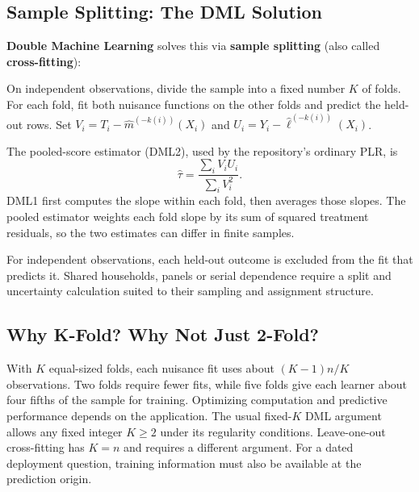 \subsection{Sample Splitting: The DML
Solution}\label{_sample_splitting_the_dml_solution}

\textbf{Double Machine Learning} solves this via \textbf{sample
splitting} (also called \textbf{cross-fitting}):

\begin{definition}
\label{def:cross_fitting}
%
On independent observations, divide the sample into a fixed number \(K\) of folds. For each fold, fit both nuisance functions on the other folds and predict the held-out rows. Set \(V_i=T_i-\widehat m^{(-k(i))}(X_i)\) and \(U_i=Y_i-\widehat\ell^{(-k(i))}(X_i)\).

The pooled-score estimator (DML2), used by the repository's ordinary PLR, is
\[
\widehat\tau=\frac{\sum_i V_i U_i}{\sum_i V_i^2}.
\]
DML1 first computes the slope within each fold, then averages those slopes. The pooled estimator weights each fold slope by its sum of squared treatment residuals, so the two estimates can differ in finite samples.

\end{definition}

For independent observations, each held-out outcome is excluded from the fit that predicts it. Shared households, panels or serial dependence require a split and uncertainty calculation suited to their sampling and assignment structure.

\subsection{Why K-Fold? Why Not Just
2-Fold?}\label{_why_k_fold_why_not_just_2_fold}

With \(K\) equal-sized folds, each nuisance fit uses about \((K-1)n/K\) observations. Two folds require fewer fits, while five folds give each learner about four fifths of the sample for training. Optimizing computation and predictive performance depends on the application. The usual fixed-\(K\) DML argument allows any fixed integer \(K\ge2\) under its regularity conditions. Leave-one-out cross-fitting has \(K=n\) and requires a different argument. For a dated deployment question, training information must also be available at the prediction origin.

